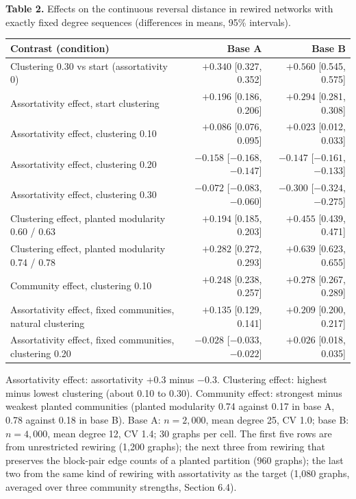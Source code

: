 \documentclass{nws}
\begin{document}
\begin{table}[t]
\centering
\textbf{Table 2.} Effects on the continuous reversal distance in rewired networks
with exactly fixed degree sequences (differences in means, 95\% intervals).

\vspace{4pt}
{\footnotesize\sf\sansmath\setlength{\tabcolsep}{4pt}
\begin{tabular}{lrr}
\toprule
Contrast (condition) & Base A & Base B\\
\midrule
Clustering 0.30 vs start (assortativity 0) & $+0.340$ [0.327, 0.352] & $+0.560$ [0.545, 0.575]\\
Assortativity effect, start clustering & $+0.196$ [0.186, 0.206] & $+0.294$ [0.281, 0.308]\\
Assortativity effect, clustering 0.10 & $+0.086$ [0.076, 0.095] & $+0.023$ [0.012, 0.033]\\
Assortativity effect, clustering 0.20 & $-0.158$ [$-0.168$, $-0.147$] & $-0.147$ [$-0.161$, $-0.133$]\\
Assortativity effect, clustering 0.30 & $-0.072$ [$-0.083$, $-0.060$] & $-0.300$ [$-0.324$, $-0.275$]\\
Clustering effect, planted modularity 0.60 / 0.63 & $+0.194$ [0.185, 0.203] & $+0.455$ [0.439, 0.471]\\
Clustering effect, planted modularity 0.74 / 0.78 & $+0.282$ [0.272, 0.293] & $+0.639$ [0.623, 0.655]\\
Community effect, clustering 0.10 & $+0.248$ [0.238, 0.257] & $+0.278$ [0.267, 0.289]\\
Assortativity effect, fixed communities, natural clustering & $+0.135$ [0.129, 0.141] & $+0.209$ [0.200, 0.217]\\
Assortativity effect, fixed communities, clustering 0.20 & $-0.028$ [$-0.033$, $-0.022$] & $+0.026$ [0.018, 0.035]\\
\bottomrule
\end{tabular}
\par}

\vspace{4pt}
{\small Assortativity effect: assortativity $+0.3$ minus $-0.3$. Clustering effect: highest minus lowest clustering (about 0.10 to 0.30). Community effect: strongest minus weakest planted communities (planted modularity 0.74 against 0.17 in base A, 0.78 against 0.18 in base B). Base A: $n=2{,}000$, mean degree 25, CV 1.0; base B: $n=4{,}000$, mean degree 12,
CV 1.4; 30 graphs per cell. The first five rows are from unrestricted rewiring (1{,}200 graphs); the next three from rewiring that preserves the block-pair edge
counts of a planted partition (960 graphs); the last two from the same kind of rewiring with assortativity as the target (1{,}080 graphs, averaged over three community strengths, Section 6.4).}
\end{table}
\end{document}
